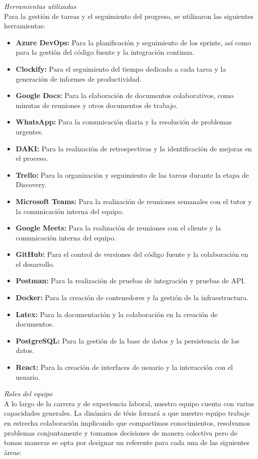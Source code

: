 \textit{Herramientas utilizadas}\\
Para la gestión de tareas y el seguimiento del progreso, se utilizaron las siguientes herramientas:
\begin{itemize}
    \item \textbf{Azure DevOps:} Para la planificación y seguimiento de los sprints, así como para la gestión del código fuente y la integración continua.
    \item \textbf{Clockify:} Para el seguimiento del tiempo dedicado a cada tarea y la generación de informes de productividad.
    \item \textbf{Google Docs:} Para la elaboración de documentos colaborativos, como minutas de reuniones y otros documentos de trabajo.
    \item \textbf{WhatsApp:} Para la comunicación diaria y la resolución de problemas urgentes.
    \item \textbf{DAKI:} Para la realización de retrospectivas y la identificación de mejoras en el proceso.
    \item \textbf{Trello:} Para la organización y seguimiento de las tareas durante la etapa de Discovery.
    \item \textbf{Microsoft Teams:} Para la realización de reuniones semanales con el tutor y la comunicación interna del equipo.
    \item \textbf{Google Meets:} Para la realización de reuniones con el cliente y la comunicación interna del equipo.
    \item \textbf{GitHub:} Para el control de versiones del código fuente y la colaboración en el desarrollo.
    \item \textbf{Postman:} Para la realización de pruebas de integración y pruebas de API.
    \item \textbf{Docker:} Para la creación de contenedores y la gestión de la infraestructura.
    \item \textbf{Latex:} Para la documentación y la colaboración en la creación de documentos.
    \item \textbf{PostgreSQL:} Para la gestión de la base de datos y la persistencia de los datos.
    \item \textbf{React:} Para la creación de interfaces de usuario y la interacción con el usuario.
\end{itemize}


\textit{Roles del equipo}\\
A lo largo de la carrera y de experiencia laboral, nuestro equipo cuenta con varias capacidades generales. La dinámica de tésis forzará a que nuestro equipo trabaje en estrecha colaboración implicando 
que compartimos conocimientos, resolvamos problemas conjuntamente y tomamos decisiones de manera colectiva pero de tomas maneras se opta por designar un referente para cada una de las siguientes áreas:

